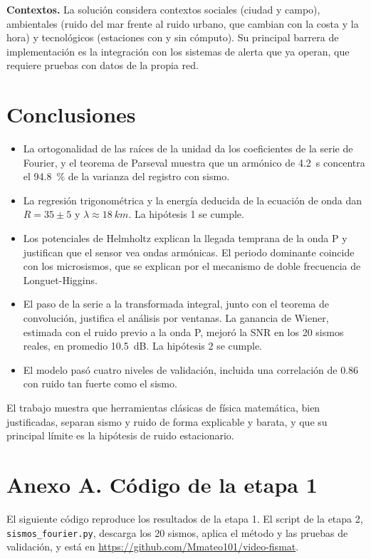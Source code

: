 \documentclass[11pt,letterpaper]{article}
\begin{document}
\textbf{Contextos.} La solución considera contextos sociales (ciudad y campo), ambientales (ruido del mar frente al ruido urbano, que cambian con la costa y la hora) y tecnológicos (estaciones con y sin cómputo). Su principal barrera de implementación es la integración con los sistemas de alerta que ya operan, que requiere pruebas con datos de la propia red.

\section{Conclusiones}
\begin{itemize}
\item La ortogonalidad de las raíces de la unidad da los coeficientes de la serie de Fourier, y el teorema de Parseval muestra que un armónico de \SI{4.2}{s} concentra el \SI{94.8}{\percent} de la varianza del registro con sismo.
\item La regresión trigonométrica y la energía deducida de la ecuación de onda dan $R = 35 \pm 5$ y $\lambda \approx \SI{18}{km}$. La hipótesis 1 se cumple.
\item Los potenciales de Helmholtz explican la llegada temprana de la onda P y justifican que el sensor vea ondas armónicas. El periodo dominante coincide con los microsismos, que se explican por el mecanismo de doble frecuencia de Longuet-Higgins.
\item El paso de la serie a la transformada integral, junto con el teorema de convolución, justifica el análisis por ventanas. La ganancia de Wiener, estimada con el ruido previo a la onda P, mejoró la SNR en los 20 sismos reales, en promedio \SI{10.5}{dB}. La hipótesis 2 se cumple.
\item El modelo pasó cuatro niveles de validación, incluida una correlación de 0.86 con ruido tan fuerte como el sismo.
\end{itemize}
El trabajo muestra que herramientas clásicas de física matemática, bien justificadas, separan sismo y ruido de forma explicable y barata, y que su principal límite es la hipótesis de ruido estacionario.

\printbibliography[title={Referencias}]

\appendix
\section*{Anexo A. Código de la etapa 1}
El siguiente código reproduce los resultados de la etapa 1. El script de la etapa 2, \texttt{sismos\_fourier.py}, descarga los 20 sismos, aplica el método y las pruebas de validación, y está en \url{https://github.com/Mmateo101/video-fismat}.

\end{document}
